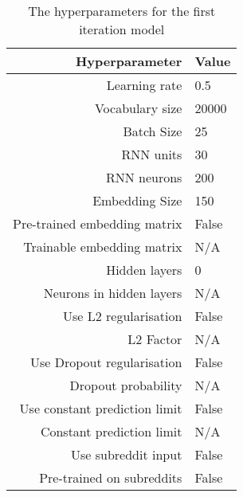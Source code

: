 \begin{table}[h!]
    \centering
    \begin{tabular}{ r  l }
        \hline
        \textbf{Hyperparameter}  &  \textbf{Value} \\ \hline \hline
        Learning rate & 0.5  \\ \hline
        Vocabulary size & 20000 \\ \hline
        Batch Size & 25 \\ \hline
        RNN units & 30  \\ \hline
        RNN neurons & 200 \\ \hline
        Embedding Size & 150 \\ \hline
        Pre-trained embedding matrix & False \\ \hline
        Trainable embedding matrix & N/A \\ \hline
        Hidden layers & 0 \\ \hline
        Neurons in hidden layers & N/A \\ \hline
        Use L2 regularisation & False \\ \hline
        L2 Factor & N/A \\ \hline
        Use Dropout regularisation & False \\ \hline
        Dropout probability & N/A\\ \hline
        Use constant prediction limit & False \\ \hline
        Constant prediction limit & N/A  \\ \hline
        Use subreddit input & False \\ \hline
        Pre-trained on subreddits & False \\ \hline
    \end{tabular}
    \caption{The hyperparameters for the first iteration model}
    \label{table:first_iter_parameters}
\end{table}